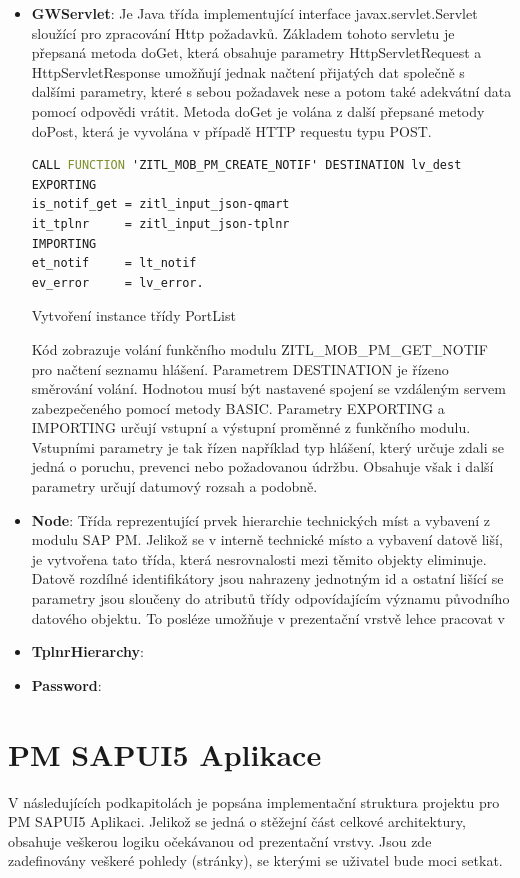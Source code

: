 \documentclass[thesis=M,czech]{FITthesis}[2012/06/26]
\begin{document}
\begin{itemize}
	\item
	\textbf{GWServlet}: Je Java třída implementující interface javax.servlet.Servlet sloužící pro zpracování Http požadavků. Základem tohoto servletu je přepsaná metoda doGet, která obsahuje parametry HttpServletRequest a HttpServletResponse umožňují jednak načtení přijatých dat společně s dalšími parametry, které s sebou požadavek nese a potom také adekvátní data pomocí odpovědi vrátit. Metoda doGet je volána z další přepsané metody doPost, která je vyvolána v případě HTTP requestu typu POST. 
	
	\begin{algorithm}[H]	
		\begin{lstlisting}[language = VHDL]  
CALL FUNCTION 'ZITL_MOB_PM_CREATE_NOTIF' DESTINATION lv_dest
EXPORTING
is_notif_get = zitl_input_json-qmart
it_tplnr     = zitl_input_json-tplnr
IMPORTING
et_notif     = lt_notif
ev_error     = lv_error.
		\end{lstlisting}
		\caption{Vytvoření instance třídy PortList}	
		\label{code:rfc_call}
		\small Kód zobrazuje volání funkčního modulu ZITL\_MOB\_PM\_GET\_NOTIF pro načtení seznamu hlášení. Parametrem DESTINATION je řízeno směrování volání. Hodnotou musí být nastavené spojení se vzdáleným servem zabezpečeného pomocí metody BASIC. Parametry EXPORTING a IMPORTING určují vstupní a výstupní proměnné z funkčního modulu. Vstupními parametry je tak řízen například typ hlášení, který určuje zdali se jedná o poruchu, prevenci nebo požadovanou údržbu. Obsahuje však i další parametry určují datumový rozsah a podobně.
	\end{algorithm}	
	
	
	\item
	\textbf{Node}: Třída reprezentující prvek hierarchie technických míst a vybavení z modulu SAP PM. Jelikož se v interně technické místo a vybavení datově liší, je vytvořena tato třída, která nesrovnalosti mezi těmito objekty eliminuje. Datově rozdílné identifikátory jsou nahrazeny jednotným id a ostatní lišící se parametry jsou sloučeny do atributů třídy odpovídajícím významu původního datového objektu. To posléze umožňuje v prezentační vrstvě lehce pracovat v 
	\item
	\textbf{TplnrHierarchy}:
	\item
	\textbf{Password}:
\end{itemize} 

\section{PM SAPUI5 Aplikace}
V následujících podkapitolách je popsána implementační struktura projektu pro PM SAPUI5 Aplikaci. Jelikož se jedná o stěžejní část celkové architektury, obsahuje veškerou logiku očekávanou od prezentační vrstvy. Jsou zde zadefinovány veškeré pohledy (stránky), se kterými se uživatel bude moci setkat.  
\end{document}
